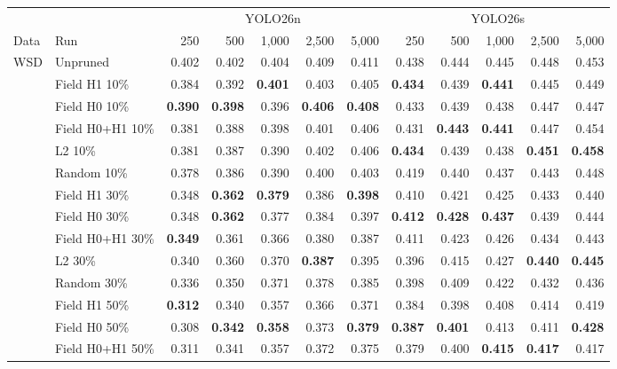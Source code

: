 \begin{tabular}{llrrrrrrrrrr}
\toprule
 & & \multicolumn{5}{c}{YOLO26n} & \multicolumn{5}{c}{YOLO26s} \\
\cmidrule(lr){3-7}\cmidrule(lr){8-12}
Data & Run & 250 & 500 & 1,000 & 2,500 & 5,000 & 250 & 500 & 1,000 & 2,500 & 5,000 \\
\midrule
WSD & Unpruned & 0.402 & 0.402 & 0.404 & 0.409 & 0.411 & 0.438 & 0.444 & 0.445 & 0.448 & 0.453 \\
 & Field H1 10\% & 0.384 & 0.392 & \textbf{0.401} & 0.403 & 0.405 & \textbf{0.434} & 0.439 & \textbf{0.441} & 0.445 & 0.449 \\
 & Field H0 10\% & \textbf{0.390} & \textbf{0.398} & 0.396 & \textbf{0.406} & \textbf{0.408} & 0.433 & 0.439 & 0.438 & 0.447 & 0.447 \\
 & Field H0+H1 10\% & 0.381 & 0.388 & 0.398 & 0.401 & 0.406 & 0.431 & \textbf{0.443} & \textbf{0.441} & 0.447 & 0.454 \\
 & L2 10\% & 0.381 & 0.387 & 0.390 & 0.402 & 0.406 & \textbf{0.434} & 0.439 & 0.438 & \textbf{0.451} & \textbf{0.458} \\
 & Random 10\% & 0.378 & 0.386 & 0.390 & 0.400 & 0.403 & 0.419 & 0.440 & 0.437 & 0.443 & 0.448 \\
\addlinespace[2pt]
 & Field H1 30\% & 0.348 & \textbf{0.362} & \textbf{0.379} & 0.386 & \textbf{0.398} & 0.410 & 0.421 & 0.425 & 0.433 & 0.440 \\
 & Field H0 30\% & 0.348 & \textbf{0.362} & 0.377 & 0.384 & 0.397 & \textbf{0.412} & \textbf{0.428} & \textbf{0.437} & 0.439 & 0.444 \\
 & Field H0+H1 30\% & \textbf{0.349} & 0.361 & 0.366 & 0.380 & 0.387 & 0.411 & 0.423 & 0.426 & 0.434 & 0.443 \\
 & L2 30\% & 0.340 & 0.360 & 0.370 & \textbf{0.387} & 0.395 & 0.396 & 0.415 & 0.427 & \textbf{0.440} & \textbf{0.445} \\
 & Random 30\% & 0.336 & 0.350 & 0.371 & 0.378 & 0.385 & 0.398 & 0.409 & 0.422 & 0.432 & 0.436 \\
\addlinespace[2pt]
 & Field H1 50\% & \textbf{0.312} & 0.340 & 0.357 & 0.366 & 0.371 & 0.384 & 0.398 & 0.408 & 0.414 & 0.419 \\
 & Field H0 50\% & 0.308 & \textbf{0.342} & \textbf{0.358} & 0.373 & \textbf{0.379} & \textbf{0.387} & \textbf{0.401} & 0.413 & 0.411 & \textbf{0.428} \\
 & Field H0+H1 50\% & 0.311 & 0.341 & 0.357 & 0.372 & 0.375 & 0.379 & 0.400 & \textbf{0.415} & \textbf{0.417} & 0.417 \\

\end{tabular}
